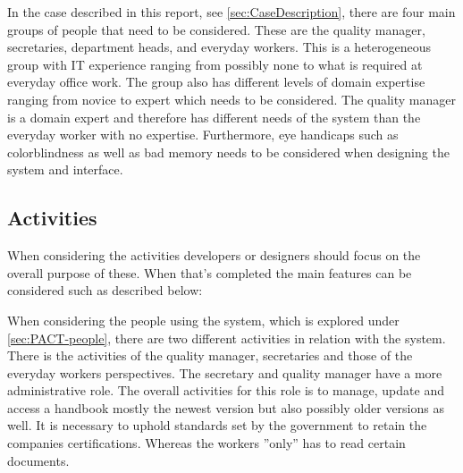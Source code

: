 In the case described in this report, see \cref{sec:CaseDescription}, there are four main groups of people that need to be considered.
These are the quality manager, secretaries, department heads, and everyday workers.
This is a heterogeneous group with IT experience ranging from possibly none to what is required at everyday office work.
The group also has different levels of domain expertise ranging from novice to expert which needs to be considered.
The quality manager is a domain expert and therefore has different needs of the system than the everyday worker with no expertise.
Furthermore, eye handicaps such as colorblindness as well as bad memory needs to be considered when designing the system and interface.

\subsection{Activities}\label{sec:PACT-actvities}
When considering the activities developers or designers should focus on the overall purpose of these.
When that's completed the main features can be considered such as described below:

When considering the people using the system, which is explored under \cref{sec:PACT-people}, there are two different activities in relation with the system.
There is the activities of the quality manager, secretaries and those of the everyday workers perspectives.
The secretary and quality manager have a more administrative role.
The overall activities for this role is to manage, update and access a handbook mostly the newest version but also possibly older versions as well.
It is necessary to uphold standards set by the government to retain the companies certifications.
Whereas the workers ''only'' has to read certain documents.

